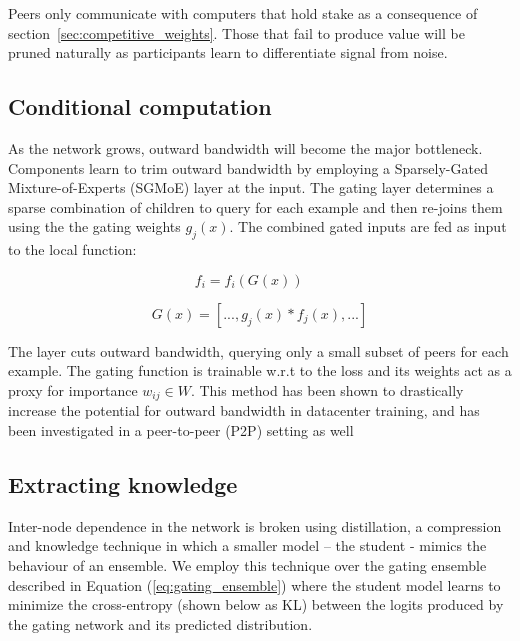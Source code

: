 \documentclass{article}
\begin{document}
Peers only communicate with computers that hold stake as a consequence of section~\ref{sec:competitive_weights}. Those that fail to produce value will be pruned naturally as participants learn to differentiate signal from noise.

\subsection{Conditional computation}

As the network grows, outward bandwidth will become the major bottleneck. Components learn to trim outward bandwidth by employing a Sparsely-Gated Mixture-of-Experts (SGMoE) \cite{shazeer2017outrageously} layer at the input. The gating layer determines a sparse combination of children to query for each example and then re-joins them using the the gating weights $g_j(x)$. The combined gated inputs are fed as input to the local function: 

\begin{equation}
f_i = f_i(G(x)) \ \ \ \  \textrm{ }
\end{equation}

\begin{equation}
\label{eq:gating_ensemble}
G(x) = [ ..., g_j(x) * f_j(x), ...]
\end{equation}


The layer cuts outward bandwidth, querying only a small subset of peers for each example. The gating function is trainable w.r.t to the loss and its weights act as a proxy for importance $w_{ij} \in W$. This method has been shown to drastically increase the potential for outward bandwidth in datacenter training,\cite{shazeer2017outrageously} and has been investigated in a peer-to-peer (P2P) setting as well \cite{Riabinin2020learningathome}


\subsection{Extracting knowledge}

Inter-node dependence in the network is broken using distillation\cite{hinton2015distilling}, a compression and knowledge technique in which a smaller model -- the student - mimics the behaviour of an ensemble. We employ this technique over the gating ensemble described in Equation (\ref{eq:gating_ensemble}) where the student model learns to minimize the cross-entropy (shown below as KL) between the logits produced by the gating network and its predicted distribution. \cite{Sanh2019DistilBERT}
\end{document}
